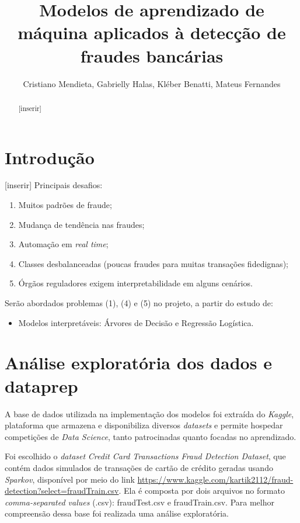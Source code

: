 \documentclass{article}
\title{Modelos de aprendizado de máquina aplicados à detecção de fraudes bancárias}
\author{Cristiano Mendieta, Gabrielly Halas, Kléber Benatti, Mateus Fernandes}
\begin{document}
\maketitle

\begin{abstract}
[inserir]
\end{abstract}


\section{Introdução}

[inserir]
Principais desafios:

\begin{enumerate}
    \item Muitos padrões de fraude;
    \item Mudança de tendência nas fraudes;
    \item Automação em \textit{real time};
    \item Classes desbalanceadas (poucas fraudes para muitas transações fidedignas);
    \item Órgãos reguladores exigem interpretabilidade em alguns cenários.
\end{enumerate}

Serão abordados problemas (1), (4) e (5) no projeto, a partir do estudo de:

\begin{itemize}
    \item Modelos interpretáveis: Árvores de Decisão e Regressão Logística.
\end{itemize}


\section{Análise exploratória dos dados e dataprep}

A base de dados utilizada na implementação dos modelos foi extraída do \textit{Kaggle}, plataforma que armazena e disponibiliza diversos \textit{datasets} e permite hospedar competições de \textit{Data Science}, tanto patrocinadas quanto focadas no aprendizado.

Foi escolhido o \textit{dataset} \textit{Credit Card Transactions Fraud Detection Dataset}, que contém dados simulados de transações de cartão de crédito geradas usando \textit{Sparkov}, disponível por meio do link  \href{https://www.kaggle.com/kartik2112/fraud-detection?select=fraudTrain.csv}{https://www.kaggle.com/kartik2112/fraud-detection?select=fraudTrain.csv}. Ela é composta por dois arquivos no formato \textit{comma-separated values} (.csv): fraudTest.csv e fraudTrain.csv. Para melhor compreensão dessa base foi realizada uma análise exploratória.  
\end{document}
